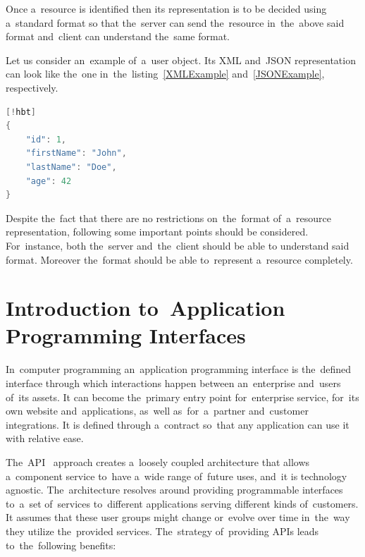 Once a~resource is identified then its representation is to be decided using
a~standard format so that the~server can send the~resource in~the~above
said format and~client can understand the~same format. 

Let us consider an~example of~a~user object. Its XML and~JSON representation can
look like the~one in~the~listing~\ref{XMLExample} and~\ref{JSONExample},
respectively.\\

\begin{lstlisting}[caption=A JSON representation of~a~\textit{user} resource.,
label=JSONExample,language=Java][!hbt]
{
	"id": 1,
	"firstName": "John",
	"lastName": "Doe",
	"age": 42
}
\end{lstlisting}

Despite the~fact that there are no restrictions on~the~format of~a~resource
representation, following some important points should be considered.
For~instance, both the~server and~the~client should be able to understand said
format. Moreover the~format should be able to~represent a~resource completely.

\section{Introduction to~Application Programming Interfaces}
In~computer programming an~application programming interface is the~defined
interface through which interactions happen between an~enterprise and~users
of~its assets. It can become the~primary entry point for~enterprise service,
for~its own website and~applications, as~well as~for~a~partner and~customer
integrations. It is defined through a~contract so~that any application can use
it with relative ease. 

The~API~\cite{RESTfulAPI} approach creates a~loosely coupled architecture that
allows a~component service to~have a~wide range of~future uses, and~it is
technology agnostic.
The~architecture resolves around providing programmable interfaces to~a~set
of~services to~different applications serving different kinds of~customers. It
assumes that these user groups might change or~evolve over time in~the~way they
utilize the~provided services. The~strategy of~providing APIs leads
to~the~following benefits:

